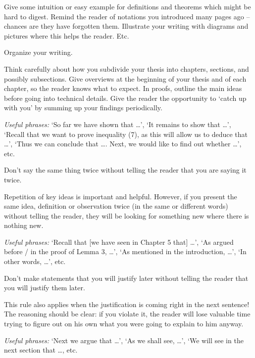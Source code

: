Give some intuition or easy example for definitions and theorems which
might be hard to digest. Remind the reader of notations you introduced
many pages ago -- chances are they have forgotten them. Illustrate your
writing with diagrams and pictures where this helps the reader. Etc.

\begin{Rule}
  Organize your writing.
\end{Rule}

Think carefully about how you subdivide your thesis into chapters,
sections, and possibly subsections.  Give overviews at the beginning
of your thesis and of each chapter, so the reader knows what to
expect. In proofs, outline the main ideas before going into technical
details. Give the reader the opportunity to `catch up with you' by
summing up your findings periodically.

\emph{Useful phrases:} `So far we have shown that \ldots', `It remains
to show that \ldots', `Recall that we want to prove inequality (7), as
this will allow us to deduce that \ldots', `Thus we can conclude that
\ldots. Next, we would like to find out whether \ldots', etc.

\begin{Rule}
  Don't say the same thing twice without telling the reader that you
  are saying it twice.
\end{Rule}

Repetition of key ideas is important and helpful. However, if you
present the same idea, definition or observation twice (in the same or
different words) without telling the reader, they will be looking for
something new where there is nothing new.

\emph{Useful phrases:} `Recall that [we have seen in Chapter 5 that]
\ldots', `As argued before / in the proof of Lemma 3, \ldots', `As
mentioned in the introduction, \ldots', `In other words, \ldots', etc.

\begin{Rule}
  Don't make statements that you will justify later without telling
  the reader that you will justify them later.
\end{Rule}

This rule also applies when the justification is coming right in the
next sentence!  The reasoning should be clear: if you violate it, the
reader will lose valuable time trying to figure out on his own what
you were going to explain to him anyway.

\emph{Useful phrases:} `Next we argue that \ldots', `As we shall see,
\ldots', `We will see in the next section that \ldots, etc.


